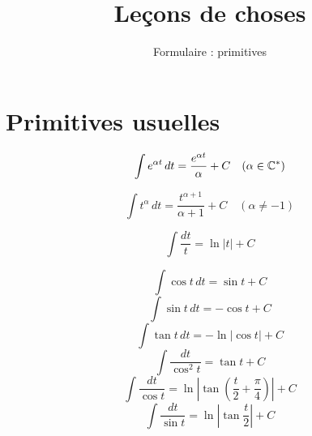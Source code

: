 







\title{{\bf Leçons de choses}}
\subtitle{Formulaire : primitives}

\begin{frame}
  
  \debutmontitre

% 

\end{frame}

\setcounter{framenumber}{0}





\section{Primitives usuelles}


\begin{frame}

$$\int e^{\alpha t} \, dt= \frac{e^{\alpha t}}{\alpha}+C \quad (\alpha \in \mathbb{C}^*)$$

\pause
\vspace{5mm}
$$\int t^{\alpha} \, dt= \frac{t^{\alpha +1}}{\alpha+1}+C \quad (\alpha \not= -1)$$

\pause
\vspace{5mm}

$$\int \frac{dt}{t} = \ln|t|+C$$
\end{frame}


\begin{frame}
$$\int \cos t \, dt = \sin t +C$$
\pause
$$\int \sin t \, dt = -\cos t +C$$
\pause
$$\int \tan t \, dt = - \ln \left| \cos t \right| +C$$
\pause
$$\int \frac{dt}{\cos^2 t} = \tan t +C$$
\pause
$$\int \frac{dt}{\cos t} = \ln \left| \tan \left( \frac{t}{2}+\frac{\pi}{4} \right) \right| +C$$
\pause
$$\int \frac{dt}{\sin t} = \ln \left| \tan \frac{t}{2} \right| +C$$
\end{frame}

